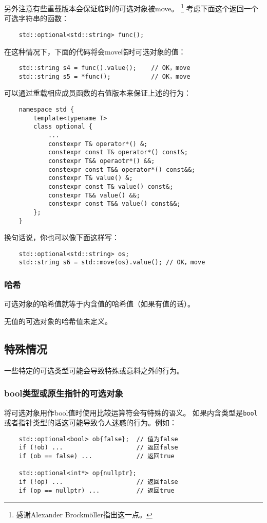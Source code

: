 另外注意有些重载版本会保证临时的可选对象被move。
\footnote{感谢Alexander Brockmöller指出这一点。}
考虑下面这个返回一个可选字符串的函数：
\begin{lstlisting}
    std::optional<std::string> func();
\end{lstlisting}
在这种情况下，下面的代码将会move临时可选对象的值：
\begin{lstlisting}
    std::string s4 = func().value();    // OK，move
    std::string s5 = *func();           // OK，move
\end{lstlisting}
可以通过重载相应成员函数的右值版本来保证上述的行为：
\begin{lstlisting}
    namespace std {
        template<typename T>
        class optional {
            ...
            constexpr T& operator*() &;
            constexpr const T& operator*() const&;
            constexpr T&& operaotr*() &&;
            constexpr const T&& operator*() const&&;
            constexpr T& value() &;
            constexpr const T& value() const&;
            constexpr T&& value() &&;
            constexpr const T&& value() const&&;
        };
    }
\end{lstlisting}
换句话说，你也可以像下面这样写：
\begin{lstlisting}
    std::optional<std::string> os;
    std::string s6 = std::move(os).value(); // OK，move
\end{lstlisting}

\subsubsection*{哈希}
可选对象的哈希值就等于内含值的哈希值（如果有值的话）。

无值的可选对象的哈希值未定义。

\subsection{特殊情况}
一些特定的可选类型可能会导致特殊或意料之外的行为。

\subsubsection{bool类型或原生指针的可选对象}\label{ch15.3.1}
将可选对象用作bool值时使用比较运算符会有特殊的语义。
如果内含类型是\texttt{bool}或者指针类型的话这可能导致令人迷惑的行为。例如：
\begin{lstlisting}
    std::optional<bool> ob{false};  // 值为false
    if (!ob) ...                    // 返回false
    if (ob == false) ...            // 返回true

    std::optional<int*> op{nullptr};
    if (!op) ...                    // 返回false
    if (op == nullptr) ...          // 返回true
\end{lstlisting}

